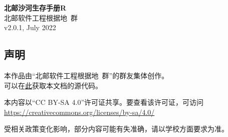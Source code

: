 \documentclass[a4paper]{article}
\begin{document}


\begin{titlepage}
    \centering
    {\Huge\rmfamily\bfseries 北邮沙河生存手册R} \\[6.5ex]
    {\Large\sffamily 北邮软件工程根据地\ 群} \\
    {\large\sffamily v2.0.1, July 2022}\\[1.5ex]
\end{titlepage}

\begin{titlepage}
    \centering
    \section*{声明}

    本作品由“北邮软件工程根据地\ 群”的群友集体创作。\\
    可以在\href{https://github.com/BUPTSE/welcome}{此}获取本文档的源代码。

    \smallskip

    本内容以“CC BY-SA 4.0”许可证共享。要查看该许可证，可访问\\
    \href{https://creativecommons.org/licenses/by-sa/4.0/}{https://creativecommons.org/licenses/by-sa/4.0/}

    \smallskip

    受相关政策变化影响，部分内容可能有失准确，请以学校方面要求为准。

    \bigskip
    \tableofcontents
\end{titlepage}

\pagestyle{fancy}
\lhead{\small \leftmark}
\chead{}
\lfoot{}
\cfoot{\thepage}
\rfoot{}
\renewcommand{\headrulewidth}{0.4pt}



\newpage


\newpage


\newpage


\newpage


\newpage


\newpage


\newpage


\newpage


\newpage


\end{document}
